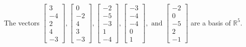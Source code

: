 \begin{exercise}
\begin{exerciseStatement}
  \end{exerciseStatement}
  \begin{exerciseAnswer}
   The vectors \(\left[\begin{array}{r}
3 \\
-4 \\
2 \\
4 \\
-3
\end{array}\right] , \left[\begin{array}{r}
0 \\
-2 \\
4 \\
3 \\
-3
\end{array}\right] , \left[\begin{array}{r}
-2 \\
-5 \\
-3 \\
1 \\
-4
\end{array}\right] , \left[\begin{array}{r}
-3 \\
-4 \\
-4 \\
0 \\
1
\end{array}\right] , \text{ and } \left[\begin{array}{r}
-2 \\
0 \\
-5 \\
2 \\
-1
\end{array}\right]\) 
  	 are  a basis of \(\mathbb{R}^5\).
  


  \end{exerciseAnswer}
\end{exercise}